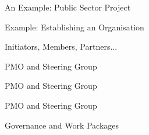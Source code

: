 \begin{frame}{An Example: Public Sector Project}
\end{frame}

\begin{frame}{Example: Establishing an Organisation}
\end{frame}


\begin{frame}{Initiators, Members, Partners...}


\end{frame}

\begin{frame}{PMO and Steering Group}
\end{frame}

\begin{frame}{PMO and Steering Group}
\end{frame}

\begin{frame}{PMO and Steering Group}
\end{frame}



\begin{frame}{Governance and Work Packages}
\end{frame}

%         

